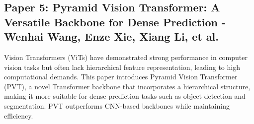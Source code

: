 \documentclass[11pt]{report}
\begin{document}

\subsection{Paper 5: Pyramid Vision Transformer: A Versatile Backbone for Dense Prediction - Wenhai Wang, Enze Xie, Xiang Li, et al.}

Vision Transformers (ViTs) have demonstrated strong performance in computer vision tasks but often lack hierarchical feature representation, leading to high computational demands. This paper introduces Pyramid Vision Transformer (PVT), a novel Transformer backbone that incorporates a hierarchical structure, making it more suitable for dense prediction tasks such as object detection and segmentation. PVT outperforms CNN-based backbones while maintaining efficiency.
\end{document}
